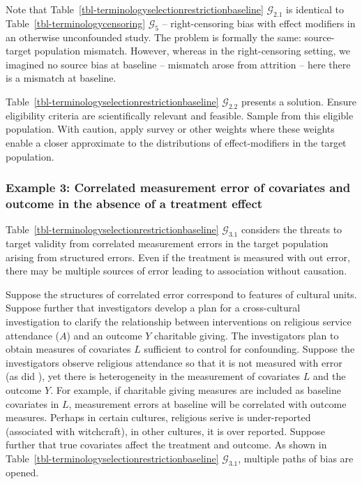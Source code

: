 \documentclass[
  single column]{article}
\begin{document}
Note that Table~\ref{tbl-terminologyselectionrestrictionbaseline}
\(\mathcal{G}_{2.1}\) is identical to
Table~\ref{tbl-terminologycensoring} \(\mathcal{G}_5\) --
right-censoring bias with effect modifiers in an otherwise unconfounded
study. The problem is formally the same: source-target population
mismatch. However, whereas in the right-censoring setting, we imagined
no source bias at baseline -- mismatch arose from attrition -- here
there is a mismatch at baseline.

Table~\ref{tbl-terminologyselectionrestrictionbaseline}
\(\mathcal{G}_{2.2}\) presents a solution. Ensure eligibility criteria
are scientifically relevant and feasible. Sample from this eligible
population. With caution, apply survey or other weights where these
weights enable a closer approximate to the distributions of
effect-modifiers in the target population.

\subsubsection{Example 3: Correlated measurement error of covariates and
outcome in the absence of a treatment
effect}\label{example-3-correlated-measurement-error-of-covariates-and-outcome-in-the-absence-of-a-treatment-effect}

Table~\ref{tbl-terminologyselectionrestrictionbaseline}
\(\mathcal{G}_{3.1}\) considers the threats to target validity from
correlated measurement errors in the target population arising from
structured errors. Even if the treatment is measured with out error,
there may be multiple sources of error leading to association without
causation.

Suppose the structures of correlated error correspond to features of
cultural units. Suppose further that investigators develop a plan for a
cross-cultural investigation to clarify the relationship between
interventions on religious service attendance (\(A\)) and an outcome
\(Y\) charitable giving. The investigators plan to obtain measures of
covariates \(L\) sufficient to control for confounding. Suppose the
investigators observe religious attendance so that it is not measured
with error (as did
),
yet there is heterogeneity in the measurement of covariates \(L\) and
the outcome \(Y\). For example, if charitable giving measures are
included as baseline covariates in \(L\), measurement errors at baseline
will be correlated with outcome measures. Perhaps in certain cultures,
religious serive is under-reported (associated with witchcraft), in
other cultures, it is over reported. Suppose further that true
covariates affect the treatment and outcome. As shown in
Table~\ref{tbl-terminologyselectionrestrictionbaseline}
\(\mathcal{G}_{3.1}\), multiple paths of bias are opened.
\end{document}
